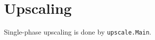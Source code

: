 \chapter{Upscaling}
\label{chap:upscale}

\minitoc

Single-phase upscaling is done by \texttt{upscale.Main}.

